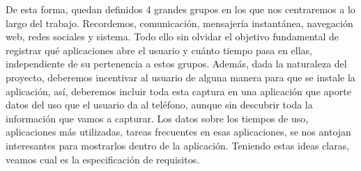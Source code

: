 \documentclass[12pt,a4paper,oneside]{book} %
\begin{document}
\newline \newline 
De esta forma, quedan definidos 4 grandes grupos en los que nos centraremos a lo largo del trabajo. Recordemos, comunicación, mensajería instantánea, navegación web, redes sociales y sistema. Todo ello sin olvidar el objetivo fundamental de registrar qué aplicaciones abre el usuario y cuánto tiempo pasa en ellas, independiente de su pertenencia a estos grupos.
\newline \newline 
Además, dada la naturaleza del proyecto, deberemos incentivar al usuario de alguna manera para que se instale la aplicación, así, deberemos incluir toda esta captura en una aplicación que aporte datos del uso que el usuario da al teléfono, aunque sin descubrir toda la información que vamos a capturar. Los datos sobre los tiempos de uso, aplicaciones más utilizadas, tareas frecuentes en esas aplicaciones, se nos antojan interesantes para mostrarlos dentro de la aplicación. 
\newline \newline 
Teniendo estas ideas claras, veamos cual es la especificación de requisitos.  
\end{document}

